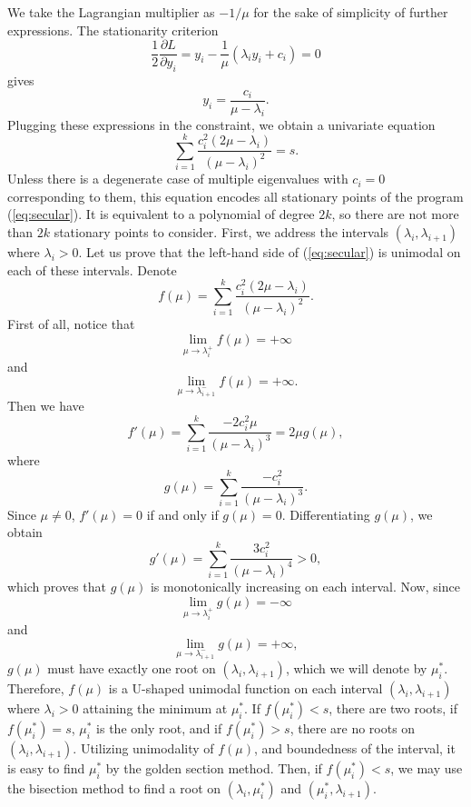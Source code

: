 \documentclass[11pt]{article}
\begin{document}
We take the Lagrangian multiplier as $-1/\mu$ for the sake of simplicity
of further expressions. The stationarity criterion
\begin{equation}
\label{eq:stat}
\frac{1}{2} \frac{\partial L}{\partial y_i} = y_i - \frac{1}{\mu} (\lambda_i y_i + c_i) = 0
\end{equation}
gives
\begin{equation}
\label{eq:yi}
y_i = \frac{c_i}{\mu - \lambda_i}.
\end{equation}
Plugging these expressions in the constraint, we obtain a univariate equation
\begin{equation}
\label{eq:secular}
\sum_{i=1}^{k} \frac{c_i^2 (2 \mu - \lambda_i)}{(\mu - \lambda_i)^2} = s.
\end{equation}
Unless there is a degenerate case of multiple eigenvalues with $c_i=0$
corresponding to them, this equation encodes all stationary
points of the program (\ref{eq:secular}). It is equivalent to
a polynomial of degree $2k$, so there are not more than $2k$ stationary
points to consider. First, we address the intervals
$(\lambda_i, \lambda_{i+1})$ where $\lambda_i>0$. Let us prove that
the left-hand side of (\ref{eq:secular}) is unimodal on each of these
intervals. Denote 
\[ f(\mu) = \sum_{i=1}^{k} \frac{c_i^2 (2 \mu - \lambda_i)}{(\mu - \lambda_i)^2}. \]
First of all, notice that
\[ \lim_{\mu \to \lambda_i^+} f(\mu) = +\infty \]
and
\[ \lim_{\mu \to \lambda_{i+1}^-} f(\mu) = +\infty. \]
Then we have
\[ f'(\mu) = \sum_{i=1}^{k} \frac{-2 c_i^2 \mu}{(\mu - \lambda_i)^3} = 2 \mu g(\mu), \]
where
\[ g(\mu) = \sum_{i=1}^{k} \frac{-c_i^2}{(\mu - \lambda_i)^3}. \]
Since $\mu \neq 0$, $f'(\mu)=0$ if and only if $g(\mu)=0$. Differentiating
$g(\mu)$, we obtain
\[ g'(\mu) = \sum_{i=1}^{k} \frac{3 c_i^2}{(\mu - \lambda_i)^4} > 0, \]
which proves that $g(\mu)$ is monotonically increasing on each interval. Now,
since
\[ \lim_{\mu \to \lambda_i^+} g(\mu) = -\infty \]
and
\[ \lim_{\mu \to \lambda_{i+1}^-} g(\mu) = +\infty, \]
$g(\mu)$ must have exactly one root on $(\lambda_i,\lambda_{i+1})$, which we
will denote by $\mu_i^*$. Therefore, $f(\mu)$ is a U-shaped unimodal function
on each interval $(\lambda_i, \lambda_{i+1})$ where $\lambda_i>0$ attaining
the minimum at $\mu_i^*$. If $f(\mu_i^*)<s$, there are two roots, if
$f(\mu_i^*)=s$, $\mu_i^*$ is the only root, and if $f(\mu_i^*)>s$, there are
no roots on $(\lambda_i,\lambda_{i+1})$. Utilizing unimodality of $f(\mu)$,
and boundedness of the interval, it is easy to find $\mu_i^*$ by the golden
section method. Then, if $f(\mu_i^*)<s$, we may use the bisection method to
find a root on $(\lambda_i,\mu_i^*)$ and $(\mu_i^*,\lambda_{i+1})$.
\end{document}
